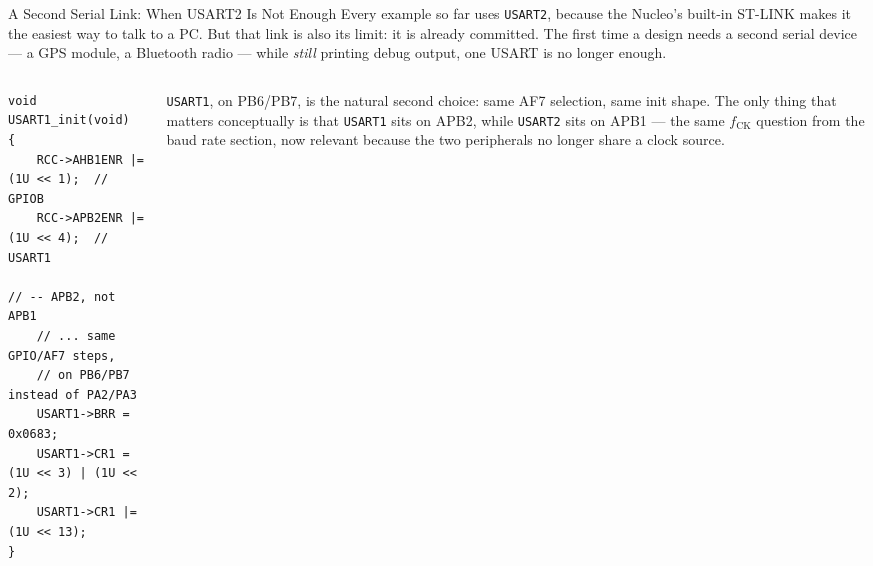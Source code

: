 \documentclass[9pt,aspectratio=169,xcolor=table]{beamer}
\begin{document}
\begin{frame}[fragile]{A Second Serial Link: When USART2 Is Not Enough}
    \leavevmode
    {\small Every example so far uses \texttt{USART2}, because the Nucleo's
    built-in ST-LINK makes it the easiest way to talk to a PC. But that link is
    also its limit: it is already committed. The first time a design needs a
    \alert{second} serial device --- a GPS module, a Bluetooth radio --- while
    \emph{still} printing debug output, one USART is no longer enough.}

    \vspace{2mm}
    \begin{columns}[c]
    \begin{column}{.52\textwidth}
    \begin{lstlisting}[style=myc, basicstyle=\scriptsize\ttfamily]
void USART1_init(void)
{
    RCC->AHB1ENR |= (1U << 1);  // GPIOB
    RCC->APB2ENR |= (1U << 4);  // USART1
                                 // -- APB2, not APB1
    // ... same GPIO/AF7 steps,
    // on PB6/PB7 instead of PA2/PA3
    USART1->BRR = 0x0683;
    USART1->CR1 = (1U << 3) | (1U << 2);
    USART1->CR1 |= (1U << 13);
}
    \end{lstlisting}
    \end{column}
    \begin{column}{.44\textwidth}
        {\small \texttt{USART1}, on PB6/PB7, is the natural second choice: same
        AF7 selection, same init shape. The only thing that matters
        conceptually is that \texttt{USART1} sits on \alert{APB2}, while
        \texttt{USART2} sits on \alert{APB1} --- the same $f_{\text{CK}}$
        question from the baud rate section, now relevant because the two
        peripherals no longer share a clock source.}
    \end{column}
    \end{columns}
\end{frame}
\end{document}
